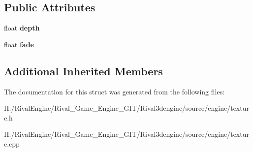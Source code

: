 \subsection*{Public Attributes}
\begin{DoxyCompactItemize}
\item 
\mbox{\label{struct_decal_slot_a606e42405d3bbdd391d9eca85a0342b4}} 
float {\bfseries depth}
\item 
\mbox{\label{struct_decal_slot_aa7a4c1cabc3861339f0064bc820ad6c6}} 
float {\bfseries fade}
\end{DoxyCompactItemize}
\subsection*{Additional Inherited Members}


The documentation for this struct was generated from the following files\+:\begin{DoxyCompactItemize}
\item 
H\+:/\+Rival\+Engine/\+Rival\+\_\+\+Game\+\_\+\+Engine\+\_\+\+G\+I\+T/\+Rival3dengine/source/engine/texture.\+h\item 
H\+:/\+Rival\+Engine/\+Rival\+\_\+\+Game\+\_\+\+Engine\+\_\+\+G\+I\+T/\+Rival3dengine/source/engine/texture.\+cpp\end{DoxyCompactItemize}
